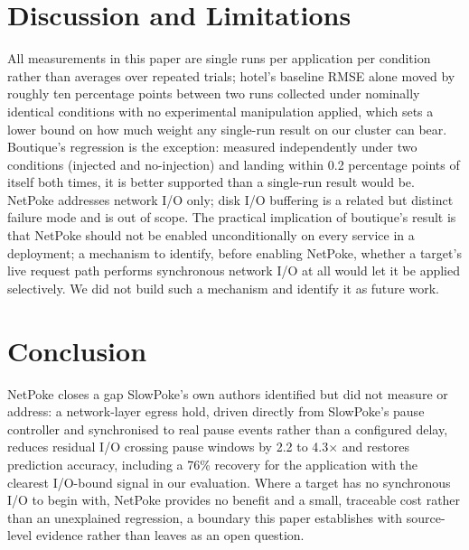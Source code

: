 \section{Discussion and Limitations}

All measurements in this paper are single runs per application per
condition rather than averages over repeated trials; hotel's baseline RMSE
alone moved by roughly ten percentage points between two runs collected
under nominally identical conditions with no experimental manipulation
applied, which sets a lower bound on how much weight any single-run result
on our cluster can bear. Boutique's regression is the exception: measured
independently under two conditions (injected and no-injection) and landing
within 0.2 percentage points of itself both times, it is better supported
than a single-run result would be. NetPoke addresses network I/O only;
disk I/O buffering is a related but distinct failure mode and is out of
scope. The practical implication of boutique's result is that NetPoke
should not be enabled unconditionally on every service in a deployment; a
mechanism to identify, before enabling NetPoke, whether a target's live
request path performs synchronous network I/O at all would let it be
applied selectively. We did not build such a mechanism and identify it as
future work.

\section{Conclusion}

NetPoke closes a gap SlowPoke's own authors identified but did not measure
or address: a network-layer egress hold, driven directly from SlowPoke's
pause controller and synchronised to real pause events rather than a
configured delay, reduces residual I/O crossing pause windows by 2.2 to
4.3$\times$ and restores prediction accuracy, including a 76\% recovery
for the application with the clearest I/O-bound signal in our evaluation.
Where a target has no synchronous I/O to begin with, NetPoke provides no
benefit and a small, traceable cost rather than an unexplained regression,
a boundary this paper establishes with source-level evidence rather than
leaves as an open question.

